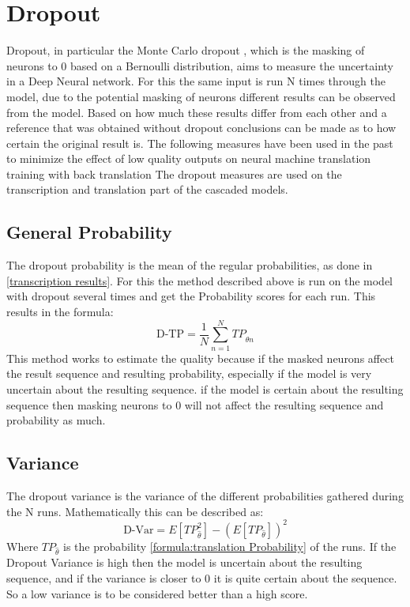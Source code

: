 \section{Dropout}
Dropout, in particular the Monte Carlo dropout \cite{gal2016dropoutbayesianapproximationrepresenting}, which is the masking of neurons to 0 based on a Bernoulli distribution, aims to measure the uncertainty in a Deep Neural network. 
For this the same input is run N times through the model, due to the potential masking of neurons different results can be observed from the model. Based on how much these results differ from each other and a reference that was obtained without dropout conclusions can be made as to how certain the original result is. 
The following measures have been used in the past to minimize the effect of low quality outputs on neural machine translation training with back translation \cite{wang-etal-2018-alibaba}
The dropout measures are used on the transcription and translation part of the cascaded models. 


\subsection{General Probability}
\label{dropoutprob}
The dropout probability is the mean of the regular probabilities, as done in \autoref{transcription results}. 
For this the method described above is run on the model with dropout several times and get the Probability scores for each run. 
This results in the formula:
$$\text{D-TP}=\frac{1}{N}\sum_{n=1}^N TP_{\hat\theta n}\label{formula:dropoutprobability}$$
This method works to estimate the quality because if the masked neurons affect the result sequence and resulting probability, especially if the model is very uncertain about the resulting sequence. if the model is certain about the resulting sequence then masking neurons to 0 will not affect the resulting sequence and probability as much. 

\subsection{Variance}
\label{dropoutvar}
The dropout variance is the variance of the different probabilities gathered during the N runs. 
Mathematically this can be described as:
$$\text{D-Var}=E[TP_{\hat\theta}^2]-(E[TP_{\hat\theta}])^2\label{formula:dropoutvariance}$$
Where $TP_{\hat\theta}$ is the probability \autoref{formula:translation Probability} of the runs. 
If the Dropout Variance is high then the model is uncertain about the resulting sequence, and if the variance is closer to 0 it is quite certain about the sequence.
So a low variance is to be considered better than a high score.

